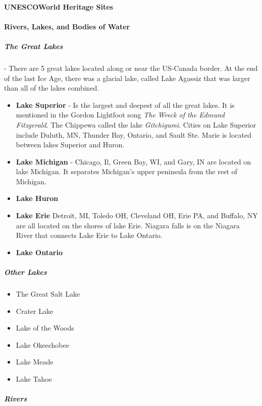 		\paragraph{UNESCOWorld Heritage Sites}
		
			
			\newpage
			\paragraph{Rivers, Lakes, and Bodies of Water}
				\subparagraph{The Great Lakes} - There are 5 great lakes located along or near the US-Canada border.  At the end of the last Ice Age, there was a glacial lake, called Lake Agassiz that was larger than all of the lakes combined.  
				
				\begin{itemize}
					\item \textbf{Lake Superior} - Is the largest and deepest of all the great lakes.  It is mentioned in the Gordon Lightfoot song \textit{The Wreck of the Edmund Fitzgerald}.  The Chippewa called the lake \textit{Gitchigumi}.  Cities on Lake Superior include Duluth, MN, Thunder Bay, Ontario, and Sault Ste. Marie is located  between lakes Superior and Huron.  
					
					\item \textbf{Lake Michigan} - Chicago, Il, Green Bay, WI, and Gary, IN are located on lake Michigan.  It separates Michigan's upper peninsula from the rest of Michigan.  
					
					
					\item \textbf{Lake Huron}
					\item \textbf{Lake Erie}  Detroit, MI, Toledo OH, Cleveland OH, Erie PA, and Buffalo, NY are all located on the shores of lake Erie.  Niagara falls is on the Niagara River that connects Lake Erie to Lake Ontario.  
					
					\item \textbf{Lake Ontario}
				\end{itemize}
								
				\subparagraph{Other Lakes}
				\begin{itemize}
					
					\item{The Great Salt Lake}
					\item{Crater Lake}
					\item{Lake of the Woods}
					\item{Lake Okeechobee}
					\item{Lake Meade}
					\item{Lake Tahoe}
				\end{itemize}
				\subparagraph{Rivers}
		
